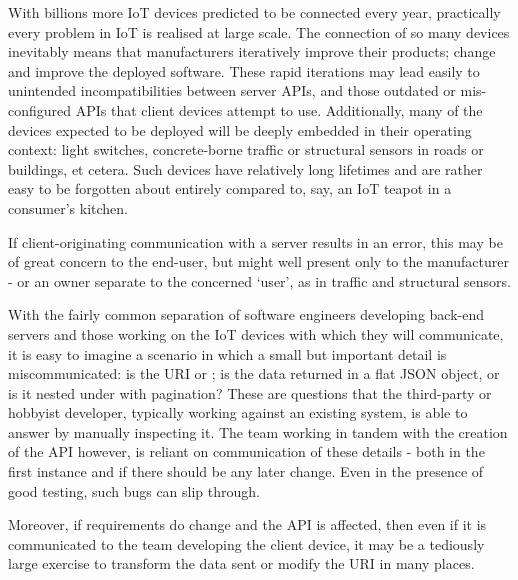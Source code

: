 With billions more IoT devices predicted to be connected every year, \cite{gartner_billions_iot} practically every problem in IoT is realised at large scale. The connection of so many devices inevitably means that manufacturers iteratively improve their products; change and improve the deployed software. These rapid iterations may lead easily to unintended incompatibilities between server APIs, and those outdated or mis-configured APIs that client devices attempt to use. Additionally, many of the devices expected to be deployed will be deeply embedded in their operating context: light switches, concrete-borne traffic or structural sensors in roads or buildings, \cite{construction_and_iot, smart_concrete} et cetera. Such devices have relatively long lifetimes and are rather easy to be forgotten about entirely compared to, say, an IoT teapot in a consumer's kitchen.

If client-originating communication with a server results in an error, this may be of great concern to the end-user, but might well present only to the manufacturer - or an owner separate to the concerned `user', as in traffic and structural sensors.

With the fairly common separation of software engineers developing back-end servers and those working on the IoT devices with which they will communicate, it is easy to imagine a scenario in which a small but important detail is miscommunicated: is the URI  or ; is the data returned in a flat JSON object, or is it nested under  with pagination? These are questions that the third-party or hobbyist developer, typically working against an existing system, is able to answer by manually inspecting it. The team working in tandem with the creation of the API however, is reliant on communication of these details - both in the first instance and if there should be any later change. Even in the presence of good testing, such bugs can slip through.

Moreover, if requirements do change and the API is affected, then even if it is communicated to the team developing the client device, it may be a tediously large exercise to transform the data sent or modify the URI in many places.
